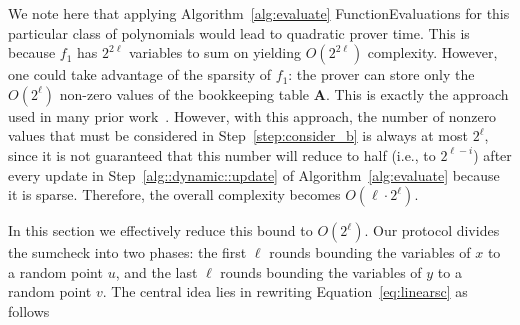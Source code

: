 					

We note here that applying Algorithm~\ref{alg:evaluate} \textsf{FunctionEvaluations} for this particular class of polynomials would lead to quadratic prover time. This is because $f_1$ has $2^{2\ell}$ variables to sum on yielding $O(2^{2\ell})$ complexity. However, one could take advantage of the sparsity of $f_1$: the prover can store only the $O(2^\ell)$ non-zero values of the bookkeeping table \textbf{A}. This is exactly the approach used in many prior work~\cite{CMT,wahby2017full,vram}. However, with this approach, the number of nonzero values that must be considered in Step~\ref{step:consider_b} is always at most $2^{\ell}$, since it is not guaranteed that this number will reduce to half (i.e., to $2^{\ell-i}$) after every update in Step~\ref{alg::dynamic::update} of Algorithm~\ref{alg:evaluate} because it is sparse. Therefore, the overall complexity becomes $O(\ell \cdot 2^\ell)$. 

In this section we effectively reduce this bound to $O(2^\ell)$. Our protocol divides the sumcheck into two phases: the first $\ell$ rounds bounding the variables of $x$ to a random point $u$, and the last $\ell$ rounds bounding the variables of $y$ to a random point $v$. The central idea lies in rewriting Equation~\ref{eq:linearsc} as follows

